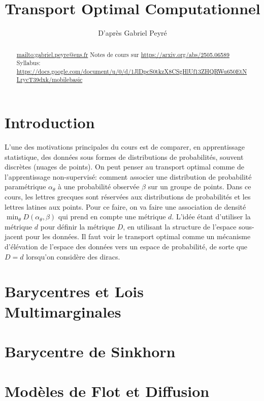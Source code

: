 \documentclass[info, math, french]{mpb-cours}
\title{Transport Optimal Computationnel}
\author{D'après Gabriel Peyré}
\begin{document}
\bettertitle
\begin{abstract}
	\url{mailto:gabriel.peyre@ens.fr}
	Notes de cours sur \url{https://arxiv.org/abs/2505.06589}
	Syllabus: \url{https://docs.google.com/document/u/0/d/1JlDpcS0tkzX8CSgHlUf13ZHQRWu650EtNLrycT39dxk/mobilebasic}
\end{abstract}

\section*{Introduction}
L'une des motivations principales du cours est de comparer, en apprentissage statistique,
des données sous formes de distributions de probabilités, souvent discrètes (nuages de points).
On peut penser au transport optimal comme de l'apprentissage non-supervisé: comment associer une
distribution de probabilité paramétrique $\alpha_{\theta}$ à une probabilité observée $\beta$ sur un groupe de points.
Dans ce cours, les lettres grecques sont réservées aux distributions de probabilités et les lettres latines
aux points.
Pour ce faire, on va faire une association de densité $\min_{\theta} D(\alpha_{\theta}, \beta)$ qui
prend en compte une métrique $d$.
L'idée étant d'utiliser la métrique $d$ pour définir la métrique $D$, en utilisant la structure
de l'espace sous-jacent pour les données.
Il faut voir le transport optimal comme un mécanisme d'élévation de l'espace des données vers un espace
de probabilité, de sorte que $D = d$ lorsqu'on considère des diracs.











\section{Barycentres et Lois Multimarginales}

\section{Barycentre de Sinkhorn}

\section{Modèles de Flot et Diffusion}
\end{document}

